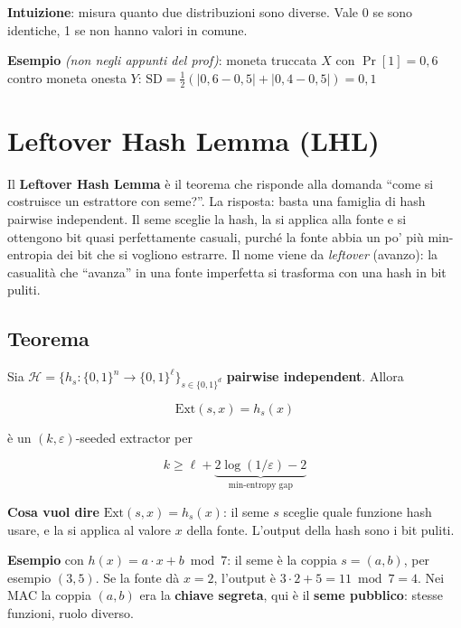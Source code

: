 \textbf{Intuizione}: misura quanto due distribuzioni sono diverse. Vale 0 se sono identiche, 1 se non hanno valori in comune.

\begin{esempio}

\textbf{Esempio} \emph{(non negli appunti del prof)}: moneta truccata \(X\) con \(\Pr[1] = 0{,}6\) contro moneta onesta \(Y\):
\(\text{SD} = \frac{1}{2}(|0{,}6 - 0{,}5| + |0{,}4 - 0{,}5|) = 0{,}1\)

\end{esempio}

\section{Leftover Hash Lemma (LHL)}

\begin{inbreve}

Il \textbf{Leftover Hash Lemma} è il teorema che risponde alla domanda ``come si costruisce un estrattore con seme?''. La risposta: basta una famiglia di hash pairwise independent. Il seme sceglie la hash, la si applica alla fonte e si ottengono bit quasi perfettamente casuali, purché la fonte abbia un po' più min-entropia dei bit che si vogliono estrarre. Il nome viene da \emph{leftover} (avanzo): la casualità che ``avanza'' in una fonte imperfetta si trasforma con una hash in bit puliti.

\end{inbreve}

\subsection{Teorema}

Sia \(\mathcal{H} = \{h_s : \{0,1\}^n \to \{0,1\}^\ell\}_{s \in \{0,1\}^d}\) \textbf{pairwise independent}. Allora

\[
\text{Ext}(s, x) = h_s(x)
\]

è un \((k, \varepsilon)\)-seeded extractor per

\[
k \ge \ell + \underbrace{2\log(1/\varepsilon) - 2}_{\text{min-entropy gap}}
\]

\textbf{Cosa vuol dire} \(\text{Ext}(s, x) = h_s(x)\): il seme \(s\) sceglie quale funzione hash usare, e la si applica al valore \(x\) della fonte. L'output della hash sono i bit puliti.

\begin{esempio}

\textbf{Esempio} con \(h(x) = a \cdot x + b \bmod 7\): il seme è la coppia \(s = (a, b)\), per esempio \((3, 5)\). Se la fonte dà \(x = 2\), l'output è \(3 \cdot 2 + 5 = 11 \bmod 7 = 4\). Nei MAC la coppia \((a, b)\) era la \textbf{chiave segreta}, qui è il \textbf{seme pubblico}: stesse funzioni, ruolo diverso.

\end{esempio}


